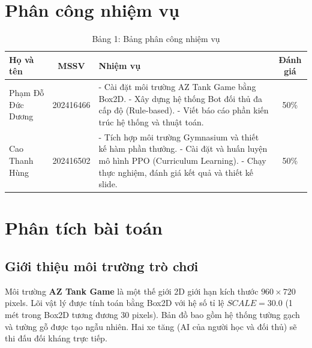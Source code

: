 \documentclass[a4paper, 12pt]{report}
\begin{document}
  \chapter*{Phân công nhiệm vụ}

  \begin{table}[H]
  \centering
  \renewcommand{\arraystretch}{1.5}
  \begin{tabular}{|l|c|p{8cm}|c|}
  \hline
  \textbf{Họ và tên} & \textbf{MSSV} & \textbf{Nhiệm vụ} & \textbf{Đánh giá} \\
  \hline
  Phạm Đỗ Đức Dương & 202416466 & 
  - Cài đặt môi trường AZ Tank Game bằng Box2D. \newline 
  - Xây dựng hệ thống Bot đối thủ đa cấp độ (Rule-based). \newline 
  - Viết báo cáo phần kiến trúc hệ thống và thuật toán. & 50\% \\
  \hline
  Cao Thanh Hùng & 202416502 & 
  - Tích hợp môi trường Gymnasium và thiết kế hàm phần thưởng. \newline 
  - Cài đặt và huấn luyện mô hình PPO (Curriculum Learning). \newline 
  - Chạy thực nghiệm, đánh giá kết quả và thiết kế slide. & 50\% \\
  \hline
  \end{tabular}
  \caption*{Bảng 1: Bảng phân công nhiệm vụ}
  \end{table}
  \newpage

  \chapter{Phân tích bài toán}

  \section{Giới thiệu môi trường trò chơi}

  Môi trường \textbf{AZ Tank Game} là một thế giới 2D giới hạn kích thước $960 \times 720$ pixels. Lõi vật lý được tính toán bằng Box2D với hệ số tỉ lệ $SCALE = 30.0$ (1 mét trong Box2D tương đương 30 pixels). Bản đồ bao gồm hệ thống tường gạch và tường gỗ được tạo ngẫu nhiên. Hai xe tăng (AI của người học và đối thủ) sẽ thi đấu đối kháng trực tiếp.
\end{document}
